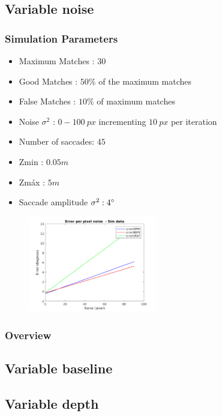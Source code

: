 \subsection{Variable noise}
\subsubsection{Simulation Parameters}
\begin{itemize}
	\item Maximum Matches : $30$
	\item Good Matches : $50 \%$ of the maximum matches
	\item False Matches : $10 \%$ of maximum matches
	\item Noise $\sigma^2$ : $0-100 \ px$ incrementing $10 \ px$ per iteration
	\item Number of saccades: $45$
	\item Zmin : $0.05 m$
	\item Zmáx : $5 m$
	\item Saccade amplitude $\sigma^2 : 4 \degree $
\end{itemize}
\begin{figure}[ht]
	\centering
	\includegraphics[width=0.5\textwidth]{images/sim/noise.png}
	\label{cha5:sec1:noise}
\end{figure}
\subsubsection{Overview}

\subsection{Variable baseline}
\subsection{Variable depth}

